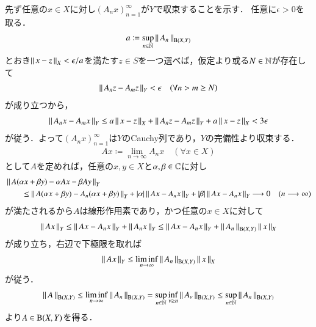 	\begin{prf}
		先ず任意の$x \in X$に対し$\left( A_n x \right)_{n=1}^{\infty}$が$Y$で収束することを示す．
		任意に$\epsilon > 0$を取る．
		\begin{align}
			a \coloneqq \operatorname*{sup}_{n \in \mathbb{N}} \left\|\, A_n\, \right\|_{\mathrm{B}(X,Y) }
		\end{align}
		とおき$\left\|\, x - z\, \right\|_{X} < \epsilon/a$を満たす$z \in S$を一つ選べば，仮定より或る$N \in \mathbb{N}$が存在して
		\begin{align}
			\left\|\, A_n z - A_m z\, \right\|_{Y} < \epsilon \quad (\forall n > m \geq N)
		\end{align}
		が成り立つから，
		\begin{align}
			\left\|\, A_n x - A_m x\, \right\|_{Y} \leq a \left\|\, x - z\, \right\|_{X} + \left\|\, A_n z - A_m z\, \right\|_{Y} + a \left\|\, x - z\, \right\|_{X} < 3\epsilon
		\end{align}
		が従う．よって$\left( A_n x \right)_{n=1}^{\infty}$は$Y$のCauchy列であり，$Y$の完備性より収束する．
		\begin{align}
			A x \coloneqq \lim_{n \to \infty} A_n x \quad (\forall x \in X)
		\end{align}
		として$A$を定めれば，任意の$x,y \in X$と$\alpha, \beta \in \mathbb{C}$に対し
		\begin{align}
			&\left\|\, A(\alpha x + \beta y) - \alpha A x - \beta A y\, \right\|_{Y} \\
			&\qquad \leq \left\|\, A(\alpha x + \beta y) - A_n(\alpha x + \beta y)\, \right\|_{Y}
				+ |\alpha| \left\|\, A x - A_n x\, \right\|_{Y} + |\beta| \left\|\, A x - A_n x\, \right\|_{Y}
			\longrightarrow 0 \quad (n \longrightarrow \infty)
		\end{align}
		が満たされるから$A$は線形作用素であり，かつ任意の$x \in X$に対して
		\begin{align}
			\left\|\, A x\, \right\|_{Y} \leq \left\|\, A x - A_n x\, \right\|_{Y} + \left\|\, A_n x\, \right\|_{Y}
			\leq \left\|\, A x - A_n x\, \right\|_{Y} + \left\|\, A_n\, \right\|_{\mathrm{B}(X,Y) } \left\|\, x\, \right\|_{X}
		\end{align}
		が成り立ち，右辺で下極限を取れば
		\begin{align}
			\left\|\, A x\, \right\|_{Y} \leq \liminf_{n \to \infty} \left\|\, A_n\, \right\|_{\mathrm{B}(X,Y) } \left\|\, x\, \right\|_{X}
		\end{align}
		が従う．
		\begin{align}
			\left\|\, A\, \right\|_{\mathrm{B}(X,Y) } \leq \liminf_{n \to \infty} \left\|\, A_n\, \right\|_{\mathrm{B}(X,Y) } = \operatorname*{sup}_{n \in \mathbb{N}} \operatorname*{inf}_{\nu \geq n} \left\|\, A_\nu\, \right\|_{\mathrm{B}(X,Y) } \leq \operatorname*{sup}_{n \in \mathbb{N}} \left\|\, A_n\, \right\|_{\mathrm{B}(X,Y) }
		\end{align}
		より$A \in \mathrm{B}(X,Y) $を得る．
		\QED
	\end{prf}
	

